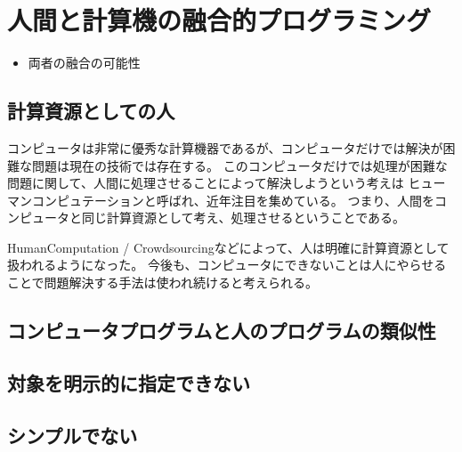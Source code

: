 \section{人間と計算機の融合的プログラミング}\label{ux4ebaux9593ux3068ux8a08ux7b97ux6a5fux306eux878dux5408ux7684ux30d7ux30edux30b0ux30e9ux30dfux30f3ux30b0}

\begin{itemize}
\itemsep1pt\parskip0pt
\item
  両者の融合の可能性
\end{itemize}

\subsection{計算資源としての人}

コンピュータは非常に優秀な計算機器であるが、コンピュータだけでは解決が困難な問題は現在の技術では存在する。
このコンピュータだけでは処理が困難な問題に関して、人間に処理させることによって解決しようという考えは
ヒューマンコンピュテーション\cite{humancomputation}と呼ばれ、近年注目を集めている。
つまり、人間をコンピュータと同じ計算資源として考え、処理させるということである。

\cite{recaptcha}

HumanComputation /
Crowdsourcingなどによって、人は明確に計算資源として扱われるようになった。
今後も、コンピュータにできないことは人にやらせることで問題解決する手法は使われ続けると考えられる。

\subsection{コンピュータプログラムと人のプログラムの類似性}

\subsection{}

\subsection{対象を明示的に指定できない}

\subsection{シンプルでない}

